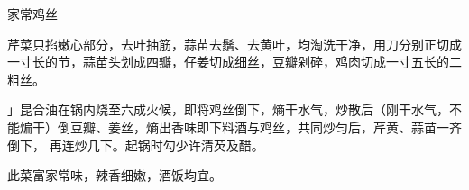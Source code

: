 \begin{recipe}{家常鸡丝}

\ingredients



\cooking

\step 芹菜只掐嫩心部分，去叶抽筋，蒜苗去鬚、去黄叶，均淘洗干净，用刀分别正切成
一寸长的节，蒜苗头划成四瓣，仔姜切成细丝，豆瓣剁碎，鸡肉切成一寸五长的二粗丝。

\step 」昆合油在锅内烧至六成火候，即将鸡丝倒下，熵干水气，炒散后（刚干水气，不
能煸干）倒豆瓣、姜丝，熵出香味即下料酒与鸡丝，共同炒匀后，芹黄、蒜苗一齐倒下，
再连炒几下。起锅时勾少许清芡及醋。

\notes

此菜富家常味，辣香细嫩，酒饭均宜。

\end{recipe}

